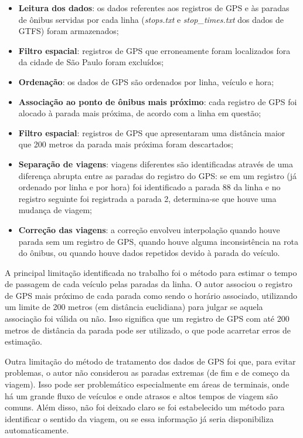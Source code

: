 \documentclass[        
    a4paper,          %
    12pt,             %
    chapter=TITLE,    %
    section=Title,    %
    subsection=Title, %
    oneside,          %
    english,          %
    spanish,          %
    brazil,           %
    fleqn             %
]{abntex2}
\begin{document}
  \begin{itemize}
  \tightlist
  \item
    \textbf{Leitura dos dados}: os dados referentes aos registros de GPS e às paradas de ônibus servidas por cada linha (\emph{stops.txt} e \emph{stop\_times.txt} dos dados de GTFS) foram armazenados;
  \item
    \textbf{Filtro espacial}: registros de GPS que erroneamente foram localizados fora da cidade de São Paulo foram excluídos;
  \item
    \textbf{Ordenação}: os dados de GPS são ordenados por linha, veículo e hora;
  \item
    \textbf{Associação ao ponto de ônibus mais próximo}: cada registro de GPS foi alocado à parada mais próxima, de acordo com a linha em questão;
  \item
    \textbf{Filtro espacial}: registros de GPS que apresentaram uma distância maior que 200 metros da parada mais próxima foram descartados;
  \item
    \textbf{Separação de viagens}: viagens diferentes são identificadas através de uma diferença abrupta entre as paradas do registro do GPS: se em um registro (já ordenado por linha e por hora) foi identificado a parada 88 da linha e no registro seguinte foi registrada a parada 2, determina-se que houve uma mudança de viagem;
  \item
    \textbf{Correção das viagens}: a correção envolveu interpolação quando houve parada sem um registro de GPS, quando houve alguma inconsistência na rota do ônibus, ou quando houve dados repetidos devido à parada do veículo.
  \end{itemize}
  
  A principal limitação identificada no trabalho foi o método para estimar o tempo de passagem de cada veículo pelas paradas da linha. O autor associou o registro de GPS mais próximo de cada parada como sendo o horário associado, utilizando um limite de 200 metros (em distância euclidiana) para julgar se aquela associação foi válida ou não. Isso significa que um registro de GPS com até 200 metros de distância da parada pode ser utilizado, o que pode acarretar erros de estimação.
  
  Outra limitação do método de tratamento dos dados de GPS foi que, para evitar problemas, o autor não considerou as paradas extremas (de fim e de começo da viagem). Isso pode ser problemático especialmente em áreas de terminais, onde há um grande fluxo de veículos e onde atrasos e altos tempos de viagem são comuns. Além disso, não foi deixado claro se foi estabelecido um método para identificar o sentido da viagem, ou se essa informação já seria disponibiliza automaticamente.
  
\end{document}
